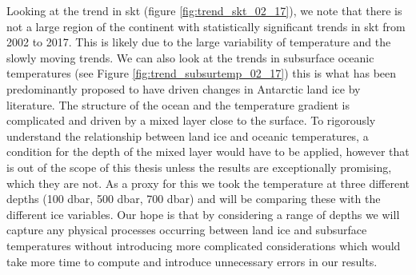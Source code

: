 \documentclass[../main.tex]{subfiles}
\begin{document}
Looking at the trend in \gls{skt} (figure \ref{fig:trend_skt_02_17}), we note that there is not a large region of the continent with statistically significant trends in \gls{skt} from 2002 to 2017. This is likely due to the large variability of temperature and the slowly moving trends. We can also look at the trends in subsurface oceanic temperatures (see Figure \ref{fig:trend_subsurtemp_02_17}) this is what has been predominantly proposed to have driven changes in Antarctic land ice by literature. The structure of the ocean and the temperature gradient is complicated and driven by a mixed layer close to the surface. To rigorously understand the relationship between land ice and oceanic temperatures, a condition for the depth of the mixed layer would have to be applied,  however that is out of the scope of this thesis unless the results are exceptionally promising, which they are not. As a proxy for this we took the temperature at three different depths (100 dbar, 500 dbar, 700 dbar) and will be comparing these with the different ice variables. Our hope is that by considering a range of depths we will capture any physical processes occurring between land ice and subsurface temperatures without introducing more complicated considerations which would take more time to compute and introduce unnecessary errors in our results.
\end{document}
